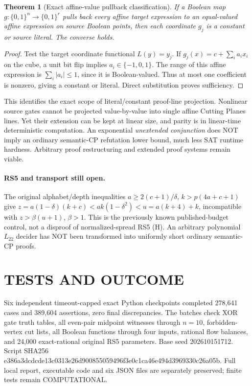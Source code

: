 \documentclass{article}
\newtheorem{theorem}{Theorem}
\begin{document}
\begin{theorem}[Exact affine-value pullback classification]
If a Boolean map $g:\{0,1\}^n\to\{0,1\}^r$ pulls back every affine target expression to an equal-valued affine expression on source Boolean points, then each coordinate $g_j$ is a constant or source literal. The converse holds.
\end{theorem}
\begin{proof}
Test the target coordinate functional $L(y)=y_j$. If $g_j(x)=c+\sum_i a_ix_i$ on the cube, a unit bit flip implies $a_i\in\{-1,0,1\}$. The range of this affine expression is $\sum_i|a_i|\le1$, since it is Boolean-valued. Thus at most one coefficient is nonzero, giving a constant or literal. Direct substitution proves sufficiency.
\end{proof}
This identifies the exact scope of literal/constant proof-line projection. Nonlinear source gates cannot be projected value-by-value into single affine Cutting Planes lines. Yet their extension can be kept at linear size, and parity is in linear-time deterministic computation. An exponential \emph{unextended conjunction} does NOT imply an ordinary semantic-CP refutation lower bound, much less SAT runtime hardness. Arbitrary proof restructuring and extended proof systems remain viable.

\paragraph{RS5 and transport still open.}
The original alphabet/depth inequalities $a\ge2(c+1)/\delta$, $k>p(4a+c+1)$ give $z=a(1-\delta)(k+c)<ak(1-\delta^2)<u=a(k+4)+k$, incompatible with $z>\beta(u+1)$, $\beta>1$. This is the previously known published-budget control, not a disproof of normalized-spread RS5 (H). An arbitrary polynomial $L_{22}$ decider has NOT been transformed into uniformly short ordinary semantic-CP proofs.
\section{TESTS AND OUTCOME}
Six independent timeout-capped exact Python checkpoints completed 278,641 cases and 389,604 assertions, zero final discrepancies. The batches check XOR gate truth tables, all even-pair midpoint witnesses through $n=10$, forbidden-vertex cut lists, all Boolean functions through four inputs, rational flow balances, and 24,000 exact-rational original RS5 parameters. Base seed 202610151712. Script SHA256 e386a3dcdcde13c0313e26d900855059496f3e0c1ca46e494d3969330c26a05b. Full local report, executable code and six JSON files are separately preserved; finite tests remain COMPUTATIONAL.
\end{document}
